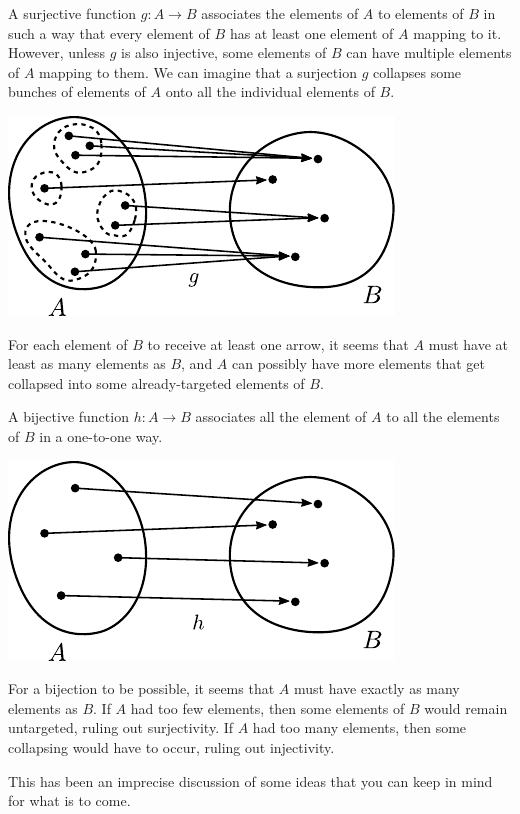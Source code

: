 \documentclass[12pt]{article}
\begin{document}
A surjective function $g:A\rightarrow B$ associates the elements of $A$ to elements of $B$ in such a way that 
every element of $B$ has at least one element of $A$ mapping to it.
However, unless $g$ is also injective, some elements of $B$ can have multiple elements of $A$ mapping to them.
We can imagine that a surjection $g$ collapses some bunches of elements of $A$ onto all the individual elements of $B$.
\begin{center}\includegraphics[scale=1]{collapse.pdf}\end{center}
For each element of $B$ to receive at least one arrow, it seems that $A$ must have at least as many elements as $B$,
and $A$ can possibly have more elements that get collapsed into some already-targeted elements of $B$.

A bijective function $h:A\rightarrow B$ associates all the element of $A$ to all the elements of $B$ in a one-to-one way.
\begin{center}\includegraphics[scale=1]{collapse2.pdf}\end{center}
For a bijection to be possible, it seems that $A$ must have exactly as many elements as $B$.
If $A$ had too few elements, then some elements of $B$ would remain untargeted, ruling out surjectivity.
If $A$ had too many elements, then some collapsing would have to occur, ruling out injectivity.

This has been an imprecise discussion of some ideas that you can keep in mind for what is to come.
\end{document}
